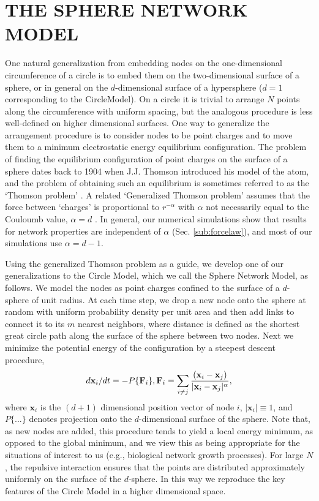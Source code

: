 \documentclass[aps,pre,reprint,superscriptaddress,amsmath,amssymb,nofootinbib]{revtex4-1}
\begin{document}
\section{THE SPHERE NETWORK MODEL}
One natural generalization from embedding nodes on the one-dimensional circumference of a circle is to embed them on the two-dimensional surface of a sphere, or in general on the $d$-dimensional surface of a hypersphere ($d=1$ corresponding to the CircleModel).
On a circle it is trivial to arrange $N$ points along the circumference with uniform spacing, but the analogous procedure is less well-defined on higher dimensional surfaces.
One way to generalize the arrangement procedure is to consider nodes to be point charges and to move them to a minimum electrostatic energy equilibrium configuration. 
The problem of finding the equilibrium configuration of point charges on the surface of a sphere dates back to 1904 when J.J. Thomson introduced his model of the atom, and the problem of obtaining such an equilibrium is sometimes referred to as the `Thomson problem' \cite{thomson1904}. A related `Generalized Thomson problem' assumes that the force between `charges' is proportional to $r^{-\alpha}$ with $\alpha$ not necessarily equal to the Couloumb value, $\alpha = d$ \cite{nelson}. In general, our numerical simulations show that results for network properties are independent of $\alpha$ (Sec. \ref{sub:forcelaw}), and most of our simulations use $\alpha = d-1$.

Using the generalized Thomson problem as a guide, we develop one of our generalizations to the Circle Model, which we call the Sphere Network Model, as follows.
We model the nodes as point charges confined to the surface of a $d$-sphere of unit radius.
At each time step, we drop a new node onto the sphere at random with uniform probability density per unit area and then add links to connect it to its $m$ nearest neighbors, where distance is defined as the shortest great circle path along the surface of the sphere between two nodes.
Next we minimize the potential energy of the configuration by a steepest descent procedure, 
\begin{equation}
d\textbf{x}_i/dt = -P\{\textbf{F}_i\},\\
\textbf{F}_i = \sum_{i \neq j} \frac{(\textbf{x}_i - \textbf{x}_j)}{|\textbf{x}_i - \textbf{x}_j|^{\alpha}},
\end{equation}
where $\textbf{x}_i$ is the $(d+1)$ dimensional position vector of node $i$, $|\textbf{x}_i| \equiv 1$, and $P\{...\}$ denotes projection onto the $d$-dimensional surface of the sphere.
Note that, as new nodes are added, this procedure tends to yield a local energy minimum, as opposed to the global minimum, and we view this as being appropriate for the situations of interest to us (e.g., biological network growth processes).
For large $N$, the repulsive interaction ensures that the points are distributed approximately uniformly on the surface of the $d$-sphere.
In this way we reproduce the key features of the Circle Model in a higher dimensional space.
\end{document}
